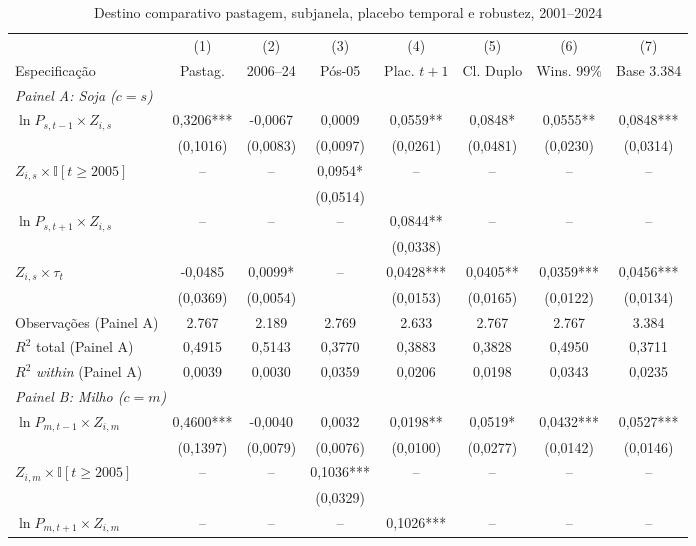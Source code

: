 \begin{table}[htbp]
\centering
\footnotesize
\setlength{\tabcolsep}{2.2pt}
\captionstyle{\centering}
\normalcaption
\caption{Destino comparativo pastagem, subjanela, placebo temporal e robustez, 2001--2024}
\label{tab:h1-destinos-robustez}
\begin{tabular}{lccccccc}
\toprule
 & (1) & (2) & (3) & (4) & (5) & (6) & (7) \\
Especificação & Pastag. & 2006--24 & Pós-05 & Plac. $t+1$ & Cl. Duplo & Wins. 99\% & Base 3.384 \\
\midrule
\multicolumn{8}{l}{\textit{Painel A: Soja ($c = s$)}} \\
$\ln P_{s,t-1} \times Z_{i,s}$ & 0,3206*** & -0,0067 & 0,0009 & 0,0559** & 0,0848* & 0,0555** & 0,0848*** \\
 & (0,1016) & (0,0083) & (0,0097) & (0,0261) & (0,0481) & (0,0230) & (0,0314) \\
$Z_{i,s} \times \mathbb{I}[t \ge 2005]$ & -- & -- & 0,0954* & -- & -- & -- & -- \\
 &  &  & (0,0514) &  &  &  &  \\
$\ln P_{s,t+1} \times Z_{i,s}$ & -- & -- & -- & 0,0844** & -- & -- & -- \\
 &  &  &  & (0,0338) &  &  &  \\
$Z_{i,s} \times \tau_t$ & -0,0485 & 0,0099* & -- & 0,0428*** & 0,0405** & 0,0359*** & 0,0456*** \\
 & (0,0369) & (0,0054) &  & (0,0153) & (0,0165) & (0,0122) & (0,0134) \\
Observações (Painel A) & 2.767 & 2.189 & 2.769 & 2.633 & 2.767 & 2.767 & 3.384 \\
$R^2$ total (Painel A) & 0,4915 & 0,5143 & 0,3770 & 0,3883 & 0,3828 & 0,4950 & 0,3711 \\
$R^2$ \textit{within} (Painel A) & 0,0039 & 0,0030 & 0,0359 & 0,0206 & 0,0198 & 0,0343 & 0,0235 \\
\midrule
\multicolumn{8}{l}{\textit{Painel B: Milho ($c = m$)}} \\
$\ln P_{m,t-1} \times Z_{i,m}$ & 0,4600*** & -0,0040 & 0,0032 & 0,0198** & 0,0519* & 0,0432*** & 0,0527*** \\
 & (0,1397) & (0,0079) & (0,0076) & (0,0100) & (0,0277) & (0,0142) & (0,0146) \\
$Z_{i,m} \times \mathbb{I}[t \ge 2005]$ & -- & -- & 0,1036*** & -- & -- & -- & -- \\
 &  &  & (0,0329) &  &  &  &  \\
$\ln P_{m,t+1} \times Z_{i,m}$ & -- & -- & -- & 0,1026*** & -- & -- & -- \\

\end{tabular}
\end{table}
